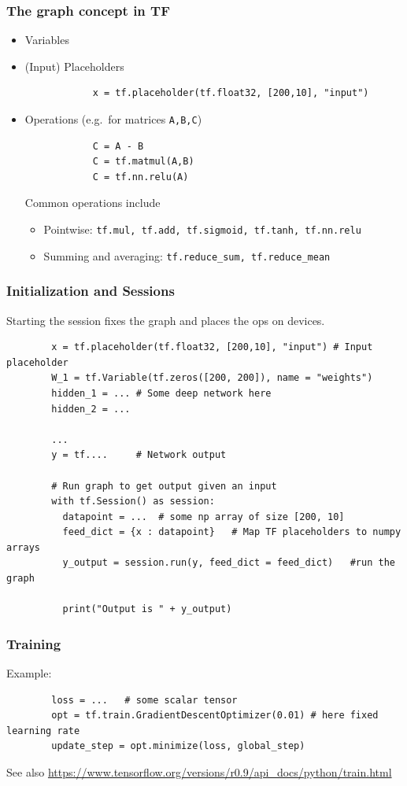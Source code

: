 \documentclass[mathserif]{beamer}
\begin{document}
\begin{frame}[fragile]
	\frametitle{The graph concept in TF}
		
	
	\begin{itemize}		
		\item Variables
		\item (Input) Placeholders
		\begin{verbatim}
			x = tf.placeholder(tf.float32, [200,10], "input")
		\end{verbatim}
		\item Operations (e.g.\ for matrices \texttt{A,B,C})
		\begin{verbatim}
			C = A - B
			C = tf.matmul(A,B)
			C = tf.nn.relu(A)
		\end{verbatim}
		Common operations include
		
		\begin{itemize}
			
			\item\footnotesize Pointwise: \texttt{tf.mul, tf.add, tf.sigmoid, tf.tanh, tf.nn.relu}
			\item\footnotesize Summing and averaging: \texttt{tf.reduce\_sum, tf.reduce\_mean}		
		\end{itemize}		
	\end{itemize}
\end{frame}


\begin{frame}[fragile]
	\frametitle{Initialization and Sessions}
	  Starting the session fixes the graph and places the ops on devices.
	
	\begin{verbatim}
		x = tf.placeholder(tf.float32, [200,10], "input") # Input placeholder
		W_1 = tf.Variable(tf.zeros([200, 200]), name = "weights")
		hidden_1 = ... # Some deep network here
		hidden_2 = ...
		
		...
		y = tf....     # Network output
		
		# Run graph to get output given an input
		with tf.Session() as session:
		  datapoint = ...  # some np array of size [200, 10]
		  feed_dict = {x : datapoint}	# Map TF placeholders to numpy arrays
		  y_output = session.run(y, feed_dict = feed_dict)   #run the graph
		  
		  print("Output is " + y_output)
	\end{verbatim}
\end{frame}


\begin{frame}[fragile]
	\frametitle{Training}
	Example:
	\begin{verbatim}
		loss = ...   # some scalar tensor
		opt = tf.train.GradientDescentOptimizer(0.01) # here fixed learning rate
		update_step = opt.minimize(loss, global_step)
	\end{verbatim}
	
	See also \url{https://www.tensorflow.org/versions/r0.9/api_docs/python/train.html}
\end{frame}
\end{document}
